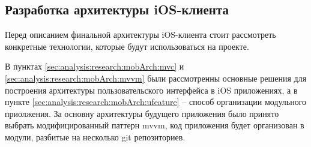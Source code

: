 \subsection{Разработка архитектуры iOS-клиента}
\label{sec:development:arch:ios}

Перед описанием финальной архитектуры iOS-клиента стоит рассмотреть конкретные технологии, которые будут использоваться на проекте.








В пунктах \ref{sec:analysis:research:mobArch:mvc} и \ref{sec:analysis:research:mobArch:mvvm} были рассмотренны основные решения для построения архитектуры пользовательского интерфейса в iOS приложениях, а в пункте \ref{sec:analysis:research:mobArch:ufeature} -- способ организации модульного приолжения. За основну архитектуры будущего приложения было принято выбрать модифицированный паттерн \gls{mvvm}, код приложения будет организован в модули, разбитые на несколько git репозиториев. 